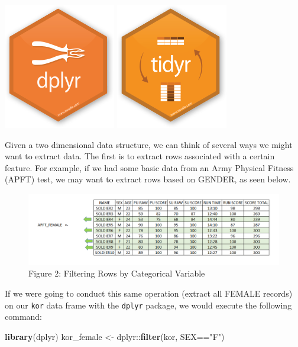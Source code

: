 \documentclass[]{book}
\newenvironment{Shaded}{\begin{snugshade}}{\end{snugshade}}
\newcommand{\KeywordTok}[1]{\textcolor[rgb]{0.13,0.29,0.53}{\textbf{{#1}}}}
\newcommand{\StringTok}[1]{\textcolor[rgb]{0.31,0.60,0.02}{{#1}}}
\newcommand{\NormalTok}[1]{{#1}}
\begin{document}
\includegraphics{dplyr.png} \includegraphics{tidyr.png}

Given a two dimensional data structure, we can think of several ways we
might want to extract data. The first is to extract rows associated with
a certain feature. For example, if we had some basic data from an Army
Physical Fitness (APFT) test, we may want to extract rows based on
GENDER, as seen below.

\begin{figure}[htbp]
\centering
\includegraphics{filterRow.PNG}
\caption{Figure 2: Filtering Rows by Categorical Variable}
\end{figure}

If we were going to conduct this same operation (extract all FEMALE
records) on our \texttt{kor} data frame with the \texttt{dplyr} package,
we would execute the following command:

\begin{Shaded}
\begin{Highlighting}[]
\KeywordTok{library}\NormalTok{(dplyr)}
\NormalTok{kor_female <-}\StringTok{ }\NormalTok{dplyr::}\KeywordTok{filter}\NormalTok{(kor, SEX==}\StringTok{"F"}\NormalTok{)}
\end{Highlighting}
\end{Shaded}
\end{document}
